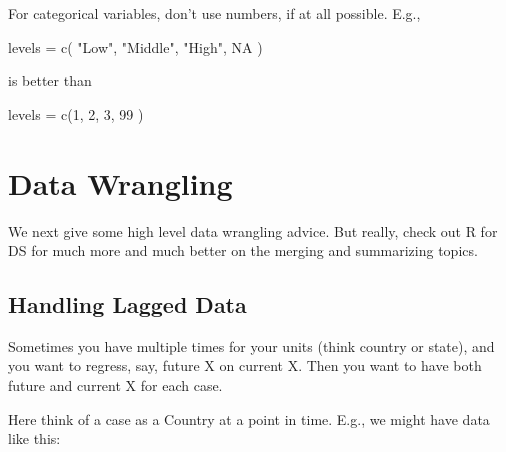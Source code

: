 \documentclass[
  letterpaper,
  DIV=11,
  numbers=noendperiod]{scrreprt}
\newenvironment{Shaded}{\begin{snugshade}}{\end{snugshade}}
\newcommand{\AttributeTok}[1]{\textcolor[rgb]{0.49,0.56,0.16}{#1}}
\newcommand{\ConstantTok}[1]{\textcolor[rgb]{0.53,0.00,0.00}{#1}}
\newcommand{\DecValTok}[1]{\textcolor[rgb]{0.25,0.63,0.44}{#1}}
\newcommand{\FunctionTok}[1]{\textcolor[rgb]{0.02,0.16,0.49}{#1}}
\newcommand{\NormalTok}[1]{\textcolor[rgb]{0.00,0.44,0.13}{#1}}
\newcommand{\OtherTok}[1]{\textcolor[rgb]{0.00,0.44,0.13}{#1}}
\newcommand{\SpecialCharTok}[1]{\textcolor[rgb]{0.25,0.44,0.63}{#1}}
\newcommand{\StringTok}[1]{\textcolor[rgb]{0.25,0.44,0.63}{#1}}
\begin{document}
For categorical variables, don't use numbers, if at all possible. E.g.,

\begin{Shaded}
\begin{Highlighting}[]
\NormalTok{levels }\OtherTok{=} \FunctionTok{c}\NormalTok{( }\StringTok{"Low"}\NormalTok{, }\StringTok{"Middle"}\NormalTok{, }\StringTok{"High"}\NormalTok{, }\ConstantTok{NA}\NormalTok{ )}
\end{Highlighting}
\end{Shaded}

is better than

\begin{Shaded}
\begin{Highlighting}[]
\NormalTok{levels }\OtherTok{=} \FunctionTok{c}\NormalTok{(}\DecValTok{1}\NormalTok{, }\DecValTok{2}\NormalTok{, }\DecValTok{3}\NormalTok{, }\DecValTok{99}\NormalTok{ )}
\end{Highlighting}
\end{Shaded}

\hypertarget{data-wrangling}{%
\section{Data Wrangling}\label{data-wrangling}}

We next give some high level data wrangling advice. But really, check
out R for DS for much more and much better on the merging and
summarizing topics.

\hypertarget{handling-lagged-data}{%
\subsection{Handling Lagged Data}\label{handling-lagged-data}}

Sometimes you have multiple times for your units (think country or
state), and you want to regress, say, future X on current X. Then you
want to have both future and current X for each case.

Here think of a case as a Country at a point in time. E.g., we might
have data like this:

\begin{Shaded}
\end{Shaded}
\end{document}
